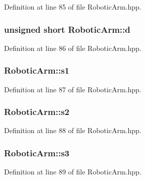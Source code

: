 Definition at line 85 of file Robotic\+Arm.\+hpp.

\subsubsection[{\texorpdfstring{d}{d}}]{\setlength{\rightskip}{0pt plus 5cm}unsigned short Robotic\+Arm\+::d}\hypertarget{class_robotic_arm_ada1f488e8627fcb18d4b15b70c593be8}{}\label{class_robotic_arm_ada1f488e8627fcb18d4b15b70c593be8}


Definition at line 86 of file Robotic\+Arm.\+hpp.

\subsubsection[{\texorpdfstring{s1}{s1}}]{ Robotic\+Arm\+::s1}\hypertarget{class_robotic_arm_a405680ac32df6d444683b997b785623f}{}\label{class_robotic_arm_a405680ac32df6d444683b997b785623f}


Definition at line 87 of file Robotic\+Arm.\+hpp.

\subsubsection[{\texorpdfstring{s2}{s2}}]{ Robotic\+Arm\+::s2}\hypertarget{class_robotic_arm_aeafd57f690026379493f193d94bd8210}{}\label{class_robotic_arm_aeafd57f690026379493f193d94bd8210}


Definition at line 88 of file Robotic\+Arm.\+hpp.

\subsubsection[{\texorpdfstring{s3}{s3}}]{ Robotic\+Arm\+::s3}\hypertarget{class_robotic_arm_a9241e65a54080f2f642bd08a78a12f6f}{}\label{class_robotic_arm_a9241e65a54080f2f642bd08a78a12f6f}


Definition at line 89 of file Robotic\+Arm.\+hpp.

